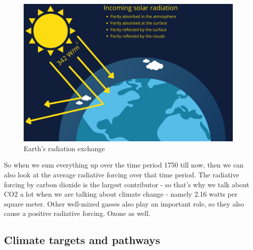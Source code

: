 \documentclass[../summary.tex]{subfiles}
\begin{document}
				\begin{figure}[h]
					\centering
					\includegraphics[width=0.7\linewidth]{../images/1-radiation-exchange.png}
					\caption{Earth's radiation exchange}
					\label{fig:1-radiation-exchange}
				\end{figure}
				\newpage
				So when we sum everything up over the time period 1750 till now, then we can also look at the average radiative forcing over that time period. The radiative forcing by carbon dioxide is the largest contributor - so that's why we talk about CO2 a lot when we are talking about climate change - namely 2.16 watts per square meter. Other well-mixed gasses also play an important role, so they also cause a positive radiative forcing. Ozone as well.
				
		\subsection{Climate targets and pathways}
\end{document}
